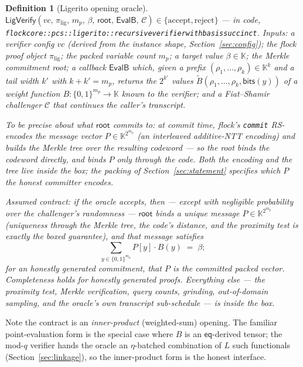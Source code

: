 \documentclass[11pt]{article}
\newcommand{\K}{\mathbb{K}}            %
\newcommand{\bits}{\{0,1\}}
\newcommand{\mle}[1]{\widetilde{#1}}
\newcommand{\eq}{\mathsf{eq}}
\newcommand{\code}[1]{{\def\_{\textunderscore\allowbreak}\texttt{#1}}}
\newcommand{\RecVerify}{\mathsf{LigVerify}}
\newtheorem{definition}{Definition}
\begin{document}
\begin{definition}[Ligerito opening oracle]\label{def:oracle}
$\RecVerify(\mathit{vc},\, \pi_{\mathrm{lig}},\, m_p,\, \beta,\,
\mathsf{root},\, \mathsf{EvalB},\, \mathcal{C}) \in \{\mathrm{accept},
\mathrm{reject}\}$
— in code,
\code{flock\_core::pcs::ligerito::recursive\_verifier\_with\_basis\_succinct}.
Inputs: a verifier config $\mathit{vc}$ (derived from the instance shape,
Section~\ref{sec:config}); the flock proof object $\pi_{\mathrm{lig}}$; the
packed variable count $m_p$; a target value $\beta \in \K$; the Merkle
commitment root; a callback $\mathsf{EvalB}$ which, given a prefix
$(\rho_1,\dots,\rho_k) \in \K^k$ and a tail width $k'$ with $k + k' = m_p$,
returns the $2^{k'}$ values $\mle{B}(\rho_1,\dots,\rho_k,\mathsf{bits}(y))$
of a weight function $B \colon \bits^{m_p} \to \K$ known to the verifier;
and a Fiat–Shamir challenger $\mathcal{C}$ that continues the caller's
transcript.

To be precise about what $\mathsf{root}$ commits to: at commit time,
flock's \code{commit} RS-encodes the \emph{message} vector
$P \in \K^{2^{m_p}}$ (an interleaved additive-NTT encoding) and builds
the Merkle tree over the resulting \emph{codeword} — so the root binds
the codeword directly, and binds $P$ only through the code.  Both the
encoding and the tree live inside the box; the packing of
Section~\ref{sec:statement} specifies which $P$ the honest committer
encodes.

\emph{Assumed contract:} if the oracle accepts, then — except with
negligible probability over the challenger's randomness — $\mathsf{root}$
binds a unique message $P \in \K^{2^{m_p}}$ (uniqueness through the
Merkle tree, the code's distance, and the proximity test is exactly the
boxed guarantee), and that message satisfies
\[
  \textstyle\sum_{y \in \bits^{m_p}} P[y]\cdot B(y) \;=\; \beta ;
\]
for an honestly generated commitment, that $P$ is the committed packed
vector.  Completeness holds for honestly generated proofs.  Everything
else — the proximity test, Merkle verification, query counts, grinding,
out-of-domain sampling, and the oracle's own transcript sub-schedule —
is inside the box.
\end{definition}

Note the contract is an \emph{inner-product} (weighted-sum) opening.
The familiar point-evaluation form is the special case where $B$ is an
$\eq$-derived tensor; the mod-$q$ verifier hands the oracle an
$\eta$-batched combination of $L$ such functionals
(Section~\ref{sec:linkage}), so the inner-product form is the honest
interface.
\end{document}

